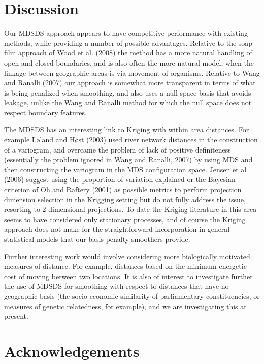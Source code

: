 \documentclass[useAMS, referee]{biom}
\begin{document}
\section{Discussion}
\label{conclusion}

Our MDSDS approach appears to have competitive performance with existing methods, while providing a number of possible advantages. Relative to the soap film approach of Wood et al. (2008) the method has a more natural handling of open and closed boundaries, and is also often the more natural model, when the linkage between geographic areas is via movement of organisms. Relative to Wang and Ranalli (2007) our approach is somewhat more transparent in terms of what is being penalized when smoothing, and also uses a null space basis that avoids leakage, unlike the Wang and Ranalli method for which the null space does not respect boundary features. 

The MDSDS has an interesting link to Kriging with within area distances. For example L{\o}land and H{\o}st (2003) used river network distances in the construction of a variogram, and overcame the problem of lack of positive definiteness (essentially the problem ignored in Wang and Ranalli, 2007) by using MDS and then constructing the variogram in the MDS configuration space. Jensen et al (2006) suggest using the proportion of variation explained or the Bayesian criterion of Oh and Raftery (2001) as possible metrics to perform projection dimension selection in the Krigging setting but do not fully address the issue, resorting to 2-dimensional projections. To date the Kriging literature in this area seems to have considered only stationary processes, and of course the Kriging approach does not make for the straightforward incorporation in general statistical models that our basis-penalty smoothers provide. 

Further interesting work would involve considering more biologically motivated measures of distance. For example, distances based on the minimum energetic cost of moving between  two locations. It is also of interest to investigate further the use of MDSDS for smoothing with respect to distances that have no geographic basis (the socio-economic similarity of parliamentary constituencies, or measures of genetic relatedness, for example), and we are investigating this at present.


\section*{Acknowledgements}
\end{document}
